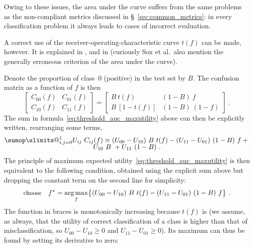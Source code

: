 \documentclass[\ifafour a4paper,12pt,\else a5paper,10pt,\fi%
onecolumn,oneside,article,%
british%
]{memoir}
\makeatletter
\theoremstyle{remark}
\theoremstyle{innote}
\def\sum{\DOTSI\sumop\slimits@}
\renewcommand*{\ge}{\geqslant}%
\DeclarePairedDelimiter\set{\{}{\}} %
\renewcommand*{\|}[1][]{\nonscript\:#1\vert\nonscript\:\mathopen{}}
\newcommand*{\sect}{\S}%
\newcommand*{\etal}{{et al.}}
\DeclareMathOperator*{\argmax}{arg\,max}
\makeatother
\begin{document}
Owing to these issues, the area under the curve suffers from the same problems as the non-compliant metrics discussed in \sect~\ref{sec:common_metrics}: in every classification problem it always leads to cases of incorrect evaluation.

A correct use of the receiver-operating-characteristic curve $t(f)$ can be made, however. It is explained in \cite[section \emph{Cost/Benefit Analysis} p.~295]{metz1978}, and in \cite[\sect~5.7.4]{soxetal1988_r2013} (curiously Sox \etal\ also mention the generally erroneous criterion of the area under the curve).

Denote the proportion of class~$0$ (positive) in the test set by $B$. The confusion matrix as a function of $f$ is then
\begin{equation}
  \label{eq:CM_fromrates}
  \begin{bmatrix}
    C_{00}(f) & C_{01}(f)\\ C_{10}(f) & C_{11}(f)
  \end{bmatrix}
  =
  \begin{bmatrix}
    B\ t(f) & (1-B)\ f \\ B\ [1-t(f)] &(1-B)\ (1-f)
  \end{bmatrix} \ .
\end{equation}
The sum in formula~\eqref{eq:threshold_auc_maxutility} above can then be explicitly written, rearranging some terms,
\begin{multline}
  \label{eq:sum_UC}
  \sum_{i,j=0}^{1} U_{ij}\ C_{ij}(f) \equiv
      (U_{00} - U_{10})\  B\ t(f) -
    (U_{11} - U_{01})\ (1-B)\ f
    +{}\\[-2\jot]
    U_{10}\ B\ + U_{11}\ (1-B) \ .
\end{multline}
The principle of maximum expected utility~\eqref{eq:threshold_auc_maxutility} is  then equivalent to the following condition, obtained using the explicit sum above but dropping the constant term on the second line for simplicity:
\begin{equation}
  \label{eq:threshold_auc_maxutility_rates}
  \text{\small choose}\quad
  f^{*} = \argmax_{f}\set[\big]{
    (U_{00} - U_{10})\  B\ t(f) -
    (U_{11} - U_{01})\ (1-B)\ f
} \ .
  \end{equation}
The function in braces is monotonically increasing because $t(f)$ is (we assume, as always, that the utility of correct classification of a class is higher than that of misclassification, so $U_{00}-U_{10} \ge 0$ and $U_{11}-U_{01} \ge 0$). Its maximum can thus be found by setting its derivative to zero:
\end{document}
